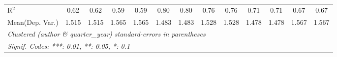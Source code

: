 \begin{tabular}{lcccccccccccc}
   R$^2$                                    & 0.62          & 0.62    & 0.59    & 0.59    & 0.80           & 0.80           & 0.76    & 0.76    & 0.71    & 0.71          & 0.67    & 0.67\\  
Mean(Dep. Var.) & 1.515 & 1.515 & 1.565 & 1.565 & 1.483 & 1.483 & 1.528 & 1.528 & 1.478 & 1.478 & 1.567 & 1.567 \\
   \midrule \midrule
   \multicolumn{13}{l}{\emph{Clustered (author \& quarter\_year) standard-errors in parentheses}}\\
   \multicolumn{13}{l}{\emph{Signif. Codes: ***: 0.01, **: 0.05, *: 0.1}}\\
\end{tabular}
\par\endgroup
